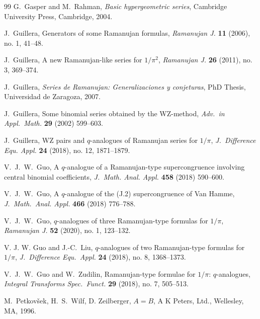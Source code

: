 \documentclass[12pt]{article}
\begin{document}
\begin{thebibliography}{99}
 G.\ Gasper and M.\ Rahman, 
 {\it Basic hypergeometric series}, 
 Cambridge University Press, Cambridge, 2004. 

 J.\ Guillera, 
 Generators of some {R}amanujan formulas, 
 \emph{Ramanujan J.} {\bf 11} (2006), no. 1, 
 41--48. 

 J.\ Guillera, 
 A new {R}amanujan-like series for {$1/\pi^2$}, 
 \emph{Ramanujan J.} {\bf 26} (2011), no. 3, 
 369--374. 

 J.\ Guillera, 
 \emph{Series de Ramanujan: Generalizaciones y conjeturas}, 
 PhD Thesis, Universidad de Zaragoza, 2007. 

 J.\ Guillera, 
 Some binomial series obtained by the {WZ}-method, 
 {\it Adv.\ in Appl.\ Math.} {\bf 29} (2002) 599--603. 

 J.\ Guillera, 
 W{Z} pairs and {$q$}-analogues of {R}amanujan series for {$1/\pi$}, 
 \emph{J.\ Difference Equ. Appl.} {\bf 24} (2018), no. 12, 
 1871--1879. 

 V.\ J.\ W.\ Guo, 
 A {$q$}-analogue of a {R}amanujan-type supercongruence involving central binomial coefficients, 
 {\it J.\ Math. Anal. Appl.} {\bf 458} (2018) 590--600. 

 V.\ J.\ W.\ Guo, 
 A {$q$}-analogue of the ({J}.2) supercongruence of {V}an {H}amme, 
 {\it J.\ Math.\ Anal. Appl.} {\bf 466} (2018) 776--788. 

 V.\ J.\ W.\ Guo, 
 {$q$}-analogues of three Ramanujan-type formulas for {$1/\pi$}, 
 \emph{Ramanujan J.} {\bf 52} (2020), no. 1, 
 123--132. 

 V. J. W. Guo and J.-C.\ Liu, 
 {$q$}-analogues of two Ramanujan-type formulas for {$1/\pi$}, 
 \emph{J.\ Difference Equ.\ Appl.} {\bf 24} (2018), no. 8, 
 1368--1373. 

 V.\ J.\ W.\ Guo and W.\ Zudilin, 
 Ramanujan-type formulae for {$1/\pi$}: {$q$}-analogues, 
 \emph{Integral Transforms Spec.\ Funct.} {\bf 29} (2018), no. 7, 
 505--513. 

 M.\ Petkov\v sek, H.\ S.\ Wilf, D. Zeilberger, 
 {{$A=B$}}, 
 A K Peters, Ltd., Wellesley, MA, 1996. 


\end{thebibliography}
\end{document}
